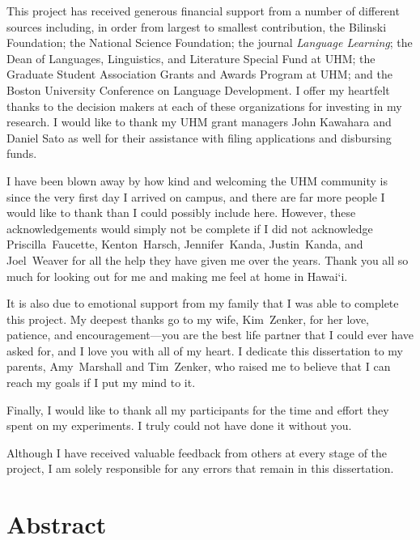 This project has received generous financial support from a number of different sources including, in order from largest to smallest contribution, the Bilinski Foundation; the National Science Foundation; the journal \textit{Language Learning}; the Dean of Languages, Linguistics, and Literature Special Fund at UHM; the Graduate Student Association Grants and Awards Program at UHM; and the Boston University Conference on Language Development. I offer my heartfelt thanks to the decision makers at each of these organizations for investing in my research. I would like to thank my UHM grant managers John Kawahara and Daniel Sato as well for their assistance with filing applications and disbursing funds.

I have been blown away by how kind and welcoming the UHM community is since the very first day I arrived on campus, and there are far more people I would like to thank than I could possibly include here. However, these acknowledgements would simply not be complete if I did not acknowledge Priscilla~Faucette, Kenton~Harsch, Jennifer~Kanda, Justin~Kanda, and Joel~Weaver for all the help they have given me over the years. Thank you all so much for looking out for me and making me feel at home in Hawai`i.

It is also due to emotional support from my family that I was able to complete this project. My deepest thanks go to my wife, Kim~Zenker, for her love, patience, and encouragement---you are the best life partner that I could ever have asked for, and I love you with all of my heart. I dedicate this dissertation to my parents, Amy~Marshall and Tim~Zenker, who raised me to believe that I can reach my goals if I put my mind to it.

Finally, I would like to thank all my participants for the time and effort they spent on my experiments. I truly could not have done it without you. 

Although I have received valuable feedback from others at every stage of the project, I am solely responsible for any errors that remain in this dissertation.


\chapter*{Abstract}

